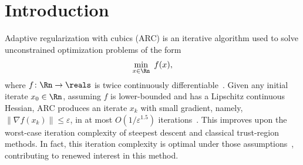 \section{Introduction} \label{sec:intro}


Adaptive regularization with cubics (ARC) is an iterative algorithm used to solve unconstrained optimization problems of the form
\begin{align*}
	\min_{x \in \Rn} \ f(x),
\end{align*}
where $f \colon \Rn \to \reals$ is twice continuously differentiable~\citep{griewank1981modification}. Given any initial iterate $x_0 \in \Rn$, assuming $f$ is lower-bounded and has a Lipschitz continuous Hessian, ARC produces an iterate $x_k$ with small gradient, namely, $\|\nabla f(x_k)\| \leq \varepsilon$, in at most $O(1/\varepsilon^{1.5})$ iterations~\citep{nesterov2006cubic,cartis2011adaptivecubic,bcgmt}. This improves upon the worst-case iteration complexity of steepest descent and classical trust-region methods.
In fact, this iteration complexity is optimal under those assumptions~\citep{carmon2017lower},
contributing to renewed interest in this method.

